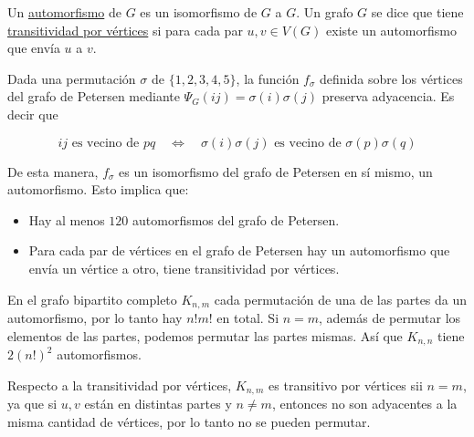 \begin{defn}
    Un \ul{automorfismo} de $G$ es un isomorfismo de $G$ a $G$. Un grafo $G$ se dice que tiene \ul{transitividad por vértices} si para cada par $u, v \in V(G)$ existe un automorfismo que envía $u$ a $v$.
\end{defn}

\begin{ejem}
    Dada una permutación $\sigma$ de $\{1,2,3,4,5\}$, la función $f_{\sigma}$ definida sobre los vértices del grafo de Petersen mediante $\Psi_{G}(ij) = \sigma(i)\sigma(j)$ preserva adyacencia. Es decir que
    
    \[
    \text{$ij$ es vecino de $pq$} \quad \iff \quad \text{$\sigma(i)\sigma(j)$ es vecino de $\sigma(p)\sigma(q)$}
    \]
    
    De esta manera, $f_{\sigma}$ es un isomorfismo del grafo de Petersen en sí mismo, un automorfismo. Esto implica que:
    
    \begin{itemize}
        \item Hay al menos $120$ automorfismos del grafo de Petersen.
        \item Para cada par de vértices en el grafo de Petersen hay un automorfismo que envía un vértice a otro, tiene transitividad por vértices.
    \end{itemize}
\end{ejem}

\begin{ejem}
    En el grafo bipartito completo $K_{n,m}$ cada permutación de una de las partes da un automorfismo, por lo tanto hay $n!m!$ en total. Si $n = m$, además de permutar los elementos de las partes, podemos permutar las partes mismas. Así que $K_{n,n}$ tiene $2(n!)^2$ automorfismos.
    
    Respecto a la transitividad por vértices, $K_{n,m}$ es transitivo por vértices sii $n = m$, ya que si $u, v$ están en distintas partes y $n \neq m$, entonces no son adyacentes a la misma cantidad de vértices, por lo tanto no se pueden permutar.
\end{ejem}

